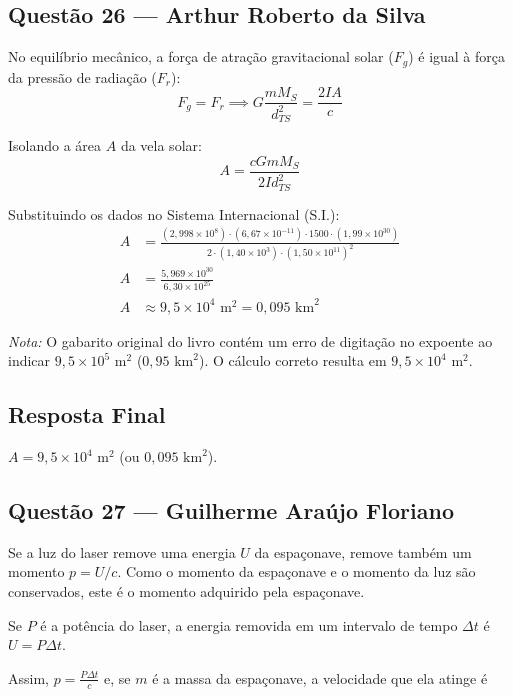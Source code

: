 \documentclass[12pt,a4paper]{article}
\begin{document}
\subsection{Questão 26 — Arthur Roberto da Silva}
No equilíbrio mecânico, a força de atração gravitacional solar ($F_g$) é igual à força da pressão de radiação ($F_r$):
\begin{equation*}
F_g = F_r \implies G \frac{m M_S}{d_{TS}^2} = \frac{2 I A}{c}
\end{equation*}

Isolando a área $A$ da vela solar:
\begin{equation*}
A = \frac{c G m M_S}{2 I d_{TS}^2}
\end{equation*}

Substituindo os dados no Sistema Internacional (S.I.):
\begin{align*}
A &= \frac{(2,998 \times 10^8) \cdot (6,67 \times 10^{-11}) \cdot 1500 \cdot (1,99 \times 10^{30})}{2 \cdot (1,40 \times 10^3) \cdot (1,50 \times 10^{11})^2} \\
A &= \frac{5,969 \times 10^{30}}{6,30 \times 10^{25}} \\
A &\approx 9,5 \times 10^4\text{ m}^2 = 0,095\text{ km}^2
\end{align*}

\noindent \textit{Nota:} O gabarito original do livro contém um erro de digitação no expoente ao indicar $9,5 \times 10^5\text{ m}^2$ ($0,95\text{ km}^2$). O cálculo correto resulta em $9,5 \times 10^4\text{ m}^2$.

\subsection*{Resposta Final}
\textbf{$A = 9,5 \times 10^4\text{ m}^2$} (ou \textbf{$0,095\text{ km}^2$}).

\subsection{Questão 27 — Guilherme Araújo Floriano}

Se a luz do laser remove uma energia $U$ da espaçonave, remove também um momento $p = U/c$. Como o momento da espaçonave e o momento da luz são conservados, este é o momento adquirido pela espaçonave. 

Se $P$ é a potência do laser, a energia removida em um intervalo de tempo $\Delta t$ é $U = P\Delta t$. 

Assim, $p = \frac{P\Delta t}{c}$ e, se $m$ é a massa da espaçonave, a velocidade que ela atinge é
\end{document}

